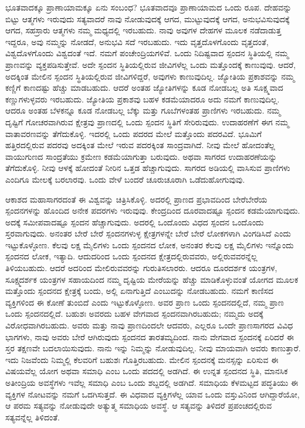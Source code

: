 ಭೂತವಾದಕ್ಕೂ ಪ್ರಾಣಾಯಾಮಕ್ಕೂ ಏನು ಸಂಬಂಧ? ಭೂತವಾದವೂ ಪ್ರಾಣಾಯಾಮದ ಒಂದು ರೂಪ. ದೇಹವನ್ನು ಬಿಟ್ಟು ಆತ್ಮಗಳು ಇರುವುದು ಸತ್ಯವಾದರೆ ನಾವು ನೋಡುವುದಕ್ಕೆ ಆಗದ, ಮುಟ್ಟುವುದಕ್ಕೆ ಆಗದ, ಅನುಭವಿಸುವುದಕ್ಕೆ ಆಗದ, ಸಹಸ್ರಾರು ಆತ್ಮಗಳು ನಮ್ಮ ಮಧ್ಯದಲ್ಲಿ ಇರಬಹುದು. ನಾವು ಅವುಗಳ ದೇಹಗಳ ಮೂಲಕ ನಡೆದಾಡುತ್ತ ಇದ್ದರೂ, ಅವು ನಮ್ಮನ್ನು ನೋಡದೆ, ಅನುಭವಿ ಸದೆ ಇರಬಹುದು. ಇದು ವೃತ್ತದೊಳಗೊಂದು ವೃತ್ತದಂತೆ, ವಿಶ್ವದೊಳಗೊಂದು ವಿಶ್ವದಂತೆ ಇದೆ. ನಮಗೆ ಪಂಚೇಂದ್ರಿಯಗಳಿವೆ. ಒಂದು ನಿದಿಷ್ಟವಾದ ಸ್ಪಂದನ ಸ್ಥಿತಿಯಲ್ಲಿ ನಮ್ಮ ಪ್ರಾಣವನ್ನು ವ್ಯಕ್ತಪಡಿಸುತ್ತೇವೆ. ಅದೇ ಸ್ಪಂದನ ಸ್ಥಿತಿಯಲ್ಲಿರುವ ಜೀವಿಗಳೆಲ್ಲ ಒಂದು ಮತ್ತೊಂದಕ್ಕೆ ಕಾಣುವುವು. ಆದರೆ, ಅದಕ್ಕಿಂತ ಮೇಲಿನ ಸ್ಪಂದನ ಸ್ಥಿತಿಯಲ್ಲಿರುವ ಜೀವಿಗಳಿದ್ದರೆ, ಅವುಗಳು ಕಾಣುವುದಿಲ್ಲ. ಜ್ಯೋತಿಯ ಪ್ರಕಾಶವನ್ನು ನಮ್ಮ ಕಣ್ಣಿಗೆ ಕಾಣದಷ್ಟು ಹೆಚ್ಚು ಮಾಡಬಹುದು. ಆದರೆ ಅಂತಹ ಜ್ಯೋತಿಗಳನ್ನು ಕೂಡ ನೋಡಬಲ್ಲ ಅತಿ ಸೂಕ್ಷ್ಮವಾದ ಕಣ್ಣುಗಳುಳ್ಳವರು ಇರಬಹುದು. ಜ್ಯೋತಿಯ ಪ್ರಕಾಶವು ಬಹಳ ಕಡಮೆಯಾದರೂ ಅದು ನಮಗೆ ಕಾಣುವುದಿಲ್ಲ. ಆದರೂ ಅಂತಹ ಬೆಳಕನ್ನೂ ಕೂಡ ನೋಡಬಲ್ಲ ಬೆಕ್ಕು ಮತ್ತು ಗೂಬೆಗಳಂತಹ ಪ್ರಾಣಿಗಳು ಇರಬಹುದು. ನಮ್ಮ ದೃಷ್ಟಿಗೆ ಗೋಚರವಾಗಿರುವ ಕ್ಷೇತ್ರವು ಪ್ರಾಣದಲ್ಲಿ ಒಂದು ಸ್ಪಂದನ ಸ್ಥಿತಿಗೆ ಸೇರಿರುವುದು. ಉದಾಹರಣೆಗೆ ಈಗ ನಮ್ಮ ವಾತಾವರಣವನ್ನು ತೆಗೆದುಕೊಳ್ಳಿ. ಇದರಲ್ಲಿ ಒಂದು ಪದರದ ಮೇಲೆ ಮತ್ತೊಂದು ಪದರವಿದೆ. ಭೂಮಿಗೆ ಹತ್ತಿರದಲ್ಲಿರುವ ಪದರವು ಅದಕ್ಕಿಂತ ಮೇಲೆ ಇರುವ ಪದರಕ್ಕಿಂತ ಸಾಂದ್ರವಾಗಿದೆ. ನೀವು ಮೇಲೆ ಹೋದಂತೆಲ್ಲ ವಾಯುಗುಣದ ಸಾಂದ್ರತೆಯು ಕ್ರಮೇಣ ಕಡಮೆಯಾಗುತ್ತಾ ಬರುವುದು. ಅಥವಾ ಸಾಗರದ ಉದಾಹರಣೆಯನ್ನು ತೆಗೆದುಕೊಳ್ಳಿ. ನೀವು ಆಳಕ್ಕೆ ಹೋದಂತೆ ನೀರಿನ ಒತ್ತಡ ಹೆಚ್ಚಾಗುವುದು. ಸಾಗರದ ಅಡಿಯಲ್ಲಿ ವಾಸಿಸುವ ಪ್ರಾಣಿಗಳು ಎಂದಿಗೂ ಮೇಲಕ್ಕೆ ಬರಲಾರವು. ಒಂದು ವೇಳೆ ಬಂದರೆ ಚೂರುಚೂರಾಗಿ ಒಡೆದುಹೋಗುವುವು. 

ಆಕಾಶದ ಮಹಾಸಾಗರದಂತೆ ಈ ವಿಶ್ವವನ್ನು ಚಿತ್ರಿಸಿಕೊಳ್ಳಿ. ಅದರಲ್ಲಿ ಪ್ರಾಣದ ಪ್ರಭಾವದಿಂದ ಬೇರೆಬೇರೆಯ ಸ್ಪಂದನಗಳನ್ನು ಹೊಂದಿದ ಅನೇಕ ಪದರಗಳು ಇರುವುವು. ಕೇಂದ್ರದಿಂದ ದೂರವಾದಷ್ಟೂ ಸ್ಪಂದನ ಕಡಮೆಯಾಗುವುದು. ಅದಕ್ಕೆ ಸಮೀಪವಾದಷ್ಟೂ ಸ್ಪಂದನ ಹೆಚ್ಚಾಗುವುದು. ಅದರಲ್ಲಿ ಒಂದೊಂದು ವಿಧದ ಸ್ಪಂದನ ಒಂದೊಂದು ಸ್ತರವಾಗುವುದು. ಅನಂತರ ಬೇರೆ ಬೇರೆ ಸ್ಪಂದನಗಳುಳ್ಳ ಕ್ಷೇತ್ರಗಳನ್ನೇ ಬೇರೆ ಬೇರೆ ಲೋಕಗಳಾಗಿ ವಿಂಗಡಿಸಿದೆ ಎಂದು ಇಟ್ಟುಕೊಳ್ಳೋಣ. ಕೆಲವು ಲಕ್ಷ ಮೈಲಿಗಳು ಒಂದು ಸ್ಪಂದನದ ಲೋಕ, ಅನಂತರ ಕೆಲವು ಲಕ್ಷ ಮೈಲಿಗಳು ಇನ್ನೊಂದು ಸ್ಪಂದನದ ಲೋಕ, ಇತ್ಯಾದಿ. ಆದುದರಿಂದ ಒಂದು ಸ್ಪಂದನದ ಕ್ಷೇತ್ರದಲ್ಲಿರುವವರು, ಅಲ್ಲಿರುವವರನ್ನೆಲ್ಲ ತಿಳಿಯಬಹುದು. ಆದರೆ ಅದರಿಂದ ಮೇಲಿರುವವರನ್ನು ಗುರುತಿಸಲಾರರು. ಆದರೂ ದೂರದರ್ಶಕ ಯಂತ್ರಗಳ, ಸೂಕ್ಷ್ಮದರ್ಶಕ ಯಂತ್ರಗಳ ಸಹಾಯದಿಂದ ನಮ್ಮ ದೃಷ್ಟಿಯ ಮೇರೆಯನ್ನು ಹೆಚ್ಚು ಮಾಡಿಕೊಳ್ಳುವಂತೆ ಯೋಗದ ಮೂಲಕ ಮತ್ತೊಂದು ಸ್ಪಂದನದ ಕ್ಷೇತ್ರಕ್ಕೆ ಬಂದು, ಅಲ್ಲಿ ಏನಾಗುತ್ತಿದೆ ಎಂಬುದನ್ನು ನೋಡಬಹುದು. ನಮಗೆ ಕಾಣಿಸದ ವ್ಯಕ್ತಿಗಳಿಂದ ಈ ಕೋಣೆ ತುಂಬಿದೆ ಎಂದು ಇಟ್ಟುಕೊಳ್ಳೋಣ. ಅವರ ಪ್ರಾಣ ಒಂದು ಸ್ಪಂದನದಲ್ಲಿದೆ, ನಮ್ಮ ಪ್ರಾಣ ಒಂದು ಸ್ಪಂದನದಲ್ಲಿದೆ. ಬಹುಶಃ ಅವರದು ಬಹಳ ವೇಗವಾದ ಸ್ಪಂದನವಾಗಿರಬಹುದು; ನಮ್ಮದು ಅದಕ್ಕೆ ವಿರೋಧವಾಗಿರಬಹುದು. ಅವರು ಮತ್ತು ನಾವು ಪ್ರಾಣದಿಂದಲೇ ಆದವರು, ಎಲ್ಲರೂ ಒಂದೇ ಪ್ರಾಣಸಾಗರದ ವಿವಿಧ ಭಾಗಗಳು, ನಾವು ಅವರು ಬೇರೆ ಆಗಿರುವುದು ಸ್ಪಂದನದ ತಾರತಮ್ಯದಿಂದ. ನಾನು ವೇಗವಾದ ಸ್ಪಂದನಕ್ಕೆ ಏರಿದರೆ ಈ ಸ್ತರ ತಕ್ಷಣವೇ ಬದಲಾಯಿಸುವುದು. ನಾನು ಇನ್ನು ನಿಮ್ಮನ್ನು ನೋಡುವುದಿಲ್ಲ. ನೀವು ಮಾಯವಾಗಿ ಅವರು ಕಾಣುತ್ತಾರೆ. ಇದು ನಿಜವೆಂದು ನಿಮ್ಮಲ್ಲಿ ಕೆಲವರಿಗೆ ಬಹುಶಃ ಗೊತ್ತಿರಬಹುದು. ಮೇಲಿನ ಸ್ಪಂದನಕ್ಕೆ ಮನಸ್ಸನ್ನು ಏರಿಸುವ ಈ ವಿಷಯವೆಲ್ಲ ಯೋಗ ಅಥವಾ ಸಮಾಧಿ ಎಂಬ ಒಂದು ಪದದಲ್ಲಿ ಅಡಗಿದೆ. ಈ ಉನ್ನತ ಸ್ಪಂದನದ ಸ್ಥಿತಿ, ಮಾನಸಿಕ ಅತೀಂದ್ರಿಯ ಅವಸ್ಥೆಗಳು ಇವೆಲ್ಲ ಸಮಾಧಿ ಎಂಬ ಒಂದು ಶಬ್ದದಲ್ಲಿ ಅಡಗಿದೆ. ಸಮಾಧಿಯ ಕೆಳಮಟ್ಟದ ಪದ್ಧತಿಯು ಈ ವ್ಯಕ್ತಿಗಳ ನೋಟವನ್ನು ನಮಗೆ ಒದಗಿಸುತ್ತದೆ. ಈ ವಿಧವಾದ ವ್ಯಕ್ತಿಗಳೆಲ್ಲ ಯಾವ ಒಂದು ವಸ್ತುವಿನಿಂದ ಆಗಿದ್ದಾರೆಯೋ, ಆ ಪರಮ ಸತ್ಯವನ್ನು ನೋಡುವುದೇ ಅತ್ಯುತ್ಮ ಸಮಾಧಿಯ ಅವಸ್ಥೆ. ಆ ಸತ್ಯವನ್ನು ತಿಳಿದರೆ ಪ್ರಪಂಚದಲ್ಲಿರುವ ಸತ್ಯವನ್ನೆಲ್ಲ ತಿಳಿದಂತೆ. 

